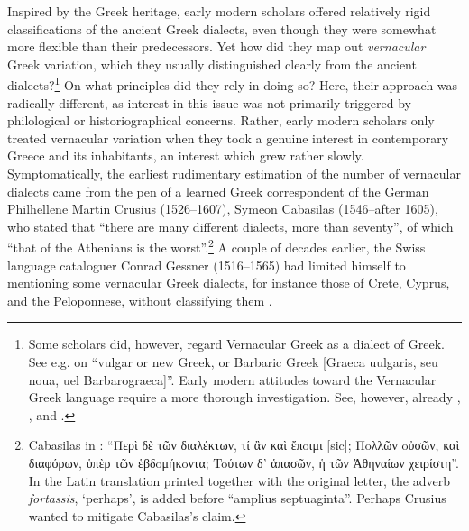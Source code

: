 Inspired by the Greek heritage, early modern scholars offered relatively rigid classifications of the ancient Greek dialects, even though they were somewhat more flexible than their predecessors. Yet how did they map out \textit{vernacular} Greek variation, which they usually distinguished clearly from the ancient dialects?\footnote{Some scholars did, however, regard Vernacular Greek as a dialect of Greek. See e.g. \citet[.7\textsc{\textsuperscript{v}}]{Megiser1603} on “vulgar or new Greek, or Barbaric Greek [Graeca uulgaris, seu noua, uel Barbarograeca]”. Early modern attitudes toward the Vernacular Greek language require a more thorough investigation. See, however, already \citet{Caratzas1952}, \citet{Rotolo1973}, and \citet{Toufexis2005}.} On what principles did they rely in doing so? Here, their approach was radically different, as interest in this issue was not primarily triggered by philological or historiographical concerns. Rather, early modern scholars only treated vernacular variation when they took a genuine interest in contemporary Greece and its inhabitants, an interest which grew rather slowly. Symptomatically, the earliest rudimentary estimation of the number of vernacular dialects came from the pen of a learned Greek correspondent of the German Philhellene Martin Crusius (1526–1607), Symeon Cabasilas (1546–after 1605), who stated that “there are many different dialects, more than seventy”, of which “that of the Athenians is the worst”.\footnote{Cabasilas in \citet[461]{Crusius1584}: “Περὶ δὲ τῶν διαλέκτων, τί ἂν καὶ ἔπoιμι [sic]; Πoλλῶν oὐσῶν, καὶ διαφόρων, ὑπὲρ τῶν ἑβδoμήκoντα; Toύτων δ' ἁπασῶν, ἡ τῶν Ἀθηναίων χειρίστη”. In the Latin translation printed together with the original letter, the adverb \textit{fortassis}, ‘perhaps’, is added before “amplius septuaginta”. Perhaps Crusius wanted to mitigate Cabasilas’s claim.} A couple of decades earlier, the Swiss language cataloguer Conrad Gessner (1516–1565) had limited himself to mentioning some vernacular Greek dialects, for instance those of Crete, Cyprus, and the Peloponnese, without classifying them \citep[47\textsc{\textsuperscript{r}}]{Gessner1555}.

